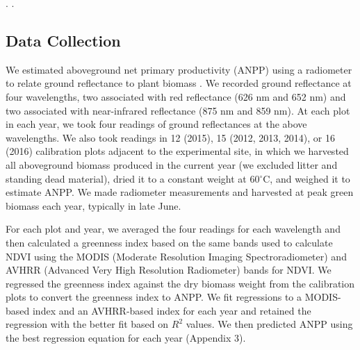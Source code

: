 \documentclass[fleqn,10pt,lineno]{wlpeerj} %
\begin{document}
\citep{Sala1992a}
\citep{Bradford2014}.
\citep{Kleinhesselink2017b}.

\subsection{Data Collection}\label{data-collection}

We estimated aboveground net primary productivity (ANPP) using a
radiometer to relate ground reflectance to plant biomass
\citep{Byrne2011}. We recorded ground reflectance at four wavelengths,
two associated with red reflectance (626 nm and 652 nm) and two
associated with near-infrared reflectance (875 nm and 859 nm). At each
plot in each year, we took four readings of ground reflectances at the
above wavelengths. We also took readings in 12 (2015), 15 (2012, 2013,
2014), or 16 (2016) calibration plots adjacent to the experimental site,
in which we harvested all aboveground biomass produced in the current
year (we excluded litter and standing dead material), dried it to a
constant weight at 60\(^{\circ}\)C, and weighed it to estimate ANPP. We
made radiometer measurements and harvested at peak green biomass each
year, typically in late June.

For each plot and year, we averaged the four readings for each
wavelength and then calculated a greenness index based on the same bands
used to calculate NDVI using the MODIS (Moderate Resolution Imaging
Spectroradiometer) and AVHRR (Advanced Very High Resolution Radiometer)
bands for NDVI. We regressed the greenness index against the dry biomass
weight from the calibration plots to convert the greenness index to
ANPP. We fit regressions to a MODIS-based index and an AVHRR-based index
for each year and retained the regression with the better fit based on
\(R^2\) values. We then predicted ANPP using the best regression
equation for each year (Appendix 3).
\end{document}
